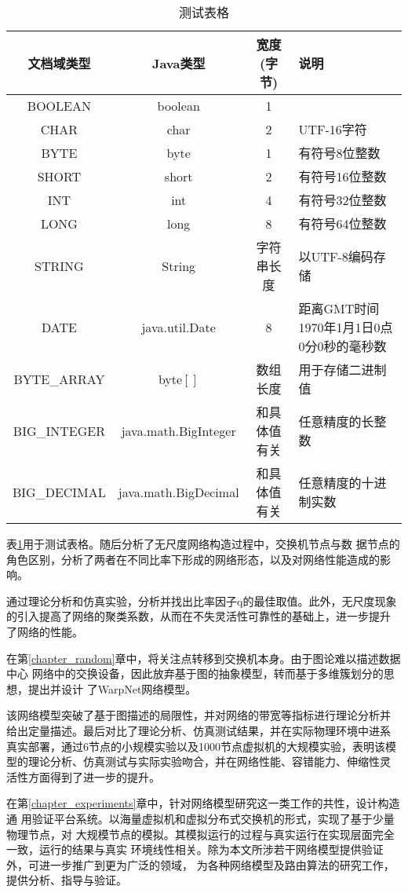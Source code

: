 \documentclass[master,winfonts]{jnuthesis}
\begin{document}
\begin{table}
  \centering
  \begin{tabular}{cccp{38mm}}
    \toprule
    \textbf{文档域类型} & \textbf{Java类型} & \textbf{宽度(字节)} & \textbf{说明} \\
    \midrule
    BOOLEAN  & boolean &  1  & \\
    CHAR     & char    &  2  & UTF-16字符 \\
    BYTE     & byte    &  1  & 有符号8位整数 \\
    SHORT    & short   &  2  & 有符号16位整数 \\
    INT      & int     &  4  & 有符号32位整数 \\
    LONG     & long    &  8  & 有符号64位整数 \\
    STRING   & String  &  字符串长度  & 以UTF-8编码存储 \\
    DATE     & java.util.Date & 8 & 距离GMT时间1970年1月1日0点0分0秒的毫秒数 \\
    BYTE\_ARRAY & byte$[]$ & 数组长度 & 用于存储二进制值 \\
    BIG\_INTEGER & java.math.BigInteger & 和具体值有关 & 任意精度的长整数 \\
    BIG\_DECIMAL & java.math.BigDecimal & 和具体值有关 & 任意精度的十进制实数 \\
    \bottomrule
  \end{tabular}
  \caption{测试表格}\label{table:test5}
\end{table}

表\ref{table:test5}用于测试表格。随后分析了无尺度网络构造过程中，交换机节点与数
据节点的角色区别，分析了两者在不同比率下形成的网络形态，以及对网络性能造成的影响。

通过理论分析和仿真实验，分析并找出比率因子q的最佳取值。此外，无尺度现象
的引入提高了网络的聚类系数，从而在不失灵活性可靠性的基础上，进一步提升
了网络的性能。

在第\ref{chapter_random}章中，将关注点转移到交换机本身。由于图论难以描述数据中心
网络中的交换设备，因此放弃基于图的抽象模型，转而基于多维簇划分的思想，提出并设计
了WarpNet网络模型。

该网络模型突破了基于图描述的局限性，并对网络的带宽等指标进行理论分析并
给出定量描述。最后对比了理论分析、仿真测试结果，并在实际物理环境中进系
真实部署，通过6节点的小规模实验以及1000节点虚拟机的大规模实验，表明该模
型的理论分析、仿真测试与实际实验吻合，并在网络性能、容错能力、伸缩性灵
活性方面得到了进一步的提升。

在第\ref{chapter_experiments}章中，针对网络模型研究这一类工作的共性，设计构造通
用验证平台系统。以海量虚拟机和虚拟分布式交换机的形式，实现了基于少量物理节点，对
大规模节点的模拟。其模拟运行的过程与真实运行在实现层面完全一致，运行的结果与真实
环境线性相关。除为本文所涉若干网络模型提供验证外，可进一步推广到更为广泛的领域，
为各种网络模型及路由算法的研究工作，提供分析、指导与验证。
\end{document}
